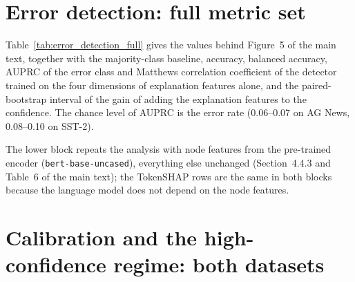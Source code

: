 \documentclass[3p,times,10pt,nopreprintline]{elsarticle}
\begin{document}
\section{Error detection: full metric set}

Table~\ref{tab:error_detection_full} gives the values behind Figure~5 of the main text, together with the majority-class baseline, accuracy, balanced accuracy, AUPRC of the error class and Matthews correlation coefficient of the detector trained on the four dimensions of explanation features alone, and the paired-bootstrap interval of the gain of adding the explanation features to the confidence. The chance level of AUPRC is the error rate (0.06--0.07 on AG News, 0.08--0.10 on SST-2).

The lower block repeats the analysis with node features from the pre-trained encoder (\texttt{bert-base-uncased}), everything else unchanged (Section~4.4.3 and Table~6 of the main text); the TokenSHAP rows are the same in both blocks because the language model does not depend on the node features.

\begin{table}[H]
\centering
\scriptsize
\setlength{\tabcolsep}{3.5pt}
\caption{Error detection with respect to the gold label, full metric set (10-fold stratified cross-validation, class-balanced logistic regression), with fine-tuned (upper block) and pre-trained (lower block) node features. Majority: accuracy of the detector that declares every prediction correct. Explanation: the four dimensions of explanation features. \(\Delta\): paired-bootstrap gain of the detector on confidence and explanation over the detector on confidence alone, with its 95\% interval.}
\label{tab:error_detection_full}
\end{table}

\section{Calibration and the high-confidence regime: both datasets}
\end{document}
